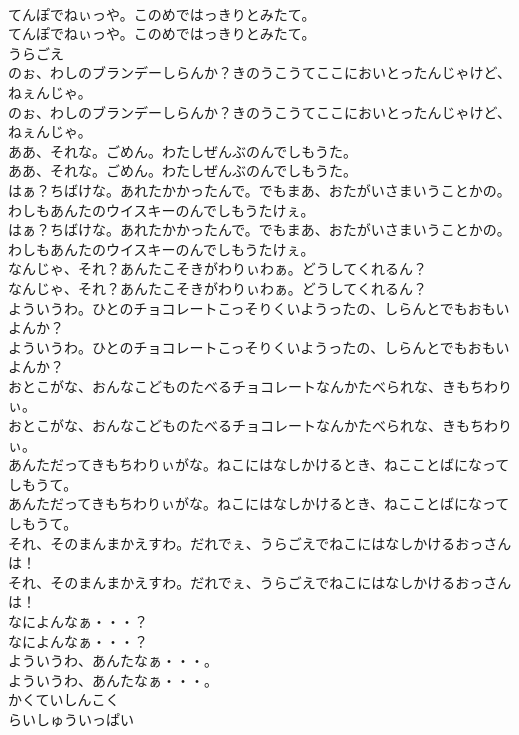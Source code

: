 \documentclass[8pt]{extreport}
\begin{document}
\begin{CJK}{UTF8}{min}
\\	てんぽでねぃっや。このめではっきりとみたて。	
\\	てんぽでねぃっや。このめではっきりとみたて。 
\\	うらごえ
\\	のぉ、わしのブランデーしらんか？きのうこうてここにおいとったんじゃけど、ねぇんじゃ。	
\\	のぉ、わしのブランデーしらんか？きのうこうてここにおいとったんじゃけど、ねぇんじゃ。 
\\	ああ、それな。ごめん。わたしぜんぶのんでしもうた。	
\\	ああ、それな。ごめん。わたしぜんぶのんでしもうた。　 
\\	はぁ？ちばけな。あれたかかったんで。でもまあ、おたがいさまいうことかの。 わしもあんたのウイスキーのんでしもうたけぇ。	
\\	はぁ？ちばけな。あれたかかったんで。でもまあ、おたがいさまいうことかの。 わしもあんたのウイスキーのんでしもうたけぇ。　　 
\\	なんじゃ、それ？あんたこそきがわりぃわぁ。どうしてくれるん？	
\\	なんじゃ、それ？あんたこそきがわりぃわぁ。どうしてくれるん？ 
\\	よういうわ。ひとのチョコレートこっそりくいようったの、しらんとでもおもいよんか？	
\\	よういうわ。ひとのチョコレートこっそりくいようったの、しらんとでもおもいよんか？　 
\\	おとこがな、おんなこどものたべるチョコレートなんかたべられな、きもちわりぃ。	
\\	おとこがな、おんなこどものたべるチョコレートなんかたべられな、きもちわりぃ。 
\\	あんただってきもちわりぃがな。ねこにはなしかけるとき、ねこことばになってしもうて。	
\\	あんただってきもちわりぃがな。ねこにはなしかけるとき、ねこことばになってしもうて。　　 
\\	それ、そのまんまかえすわ。だれでぇ、うらごえでねこにはなしかけるおっさんは！	
\\	それ、そのまんまかえすわ。だれでぇ、うらごえでねこにはなしかけるおっさんは！　　 
\\	なによんなぁ・・・？	
\\	なによんなぁ・・・？　 
\\	よういうわ、あんたなぁ・・・。	
\\	よういうわ、あんたなぁ・・・。 
\\	かくていしんこく
\\	らいしゅういっぱい

\end{CJK}
\end{document}
